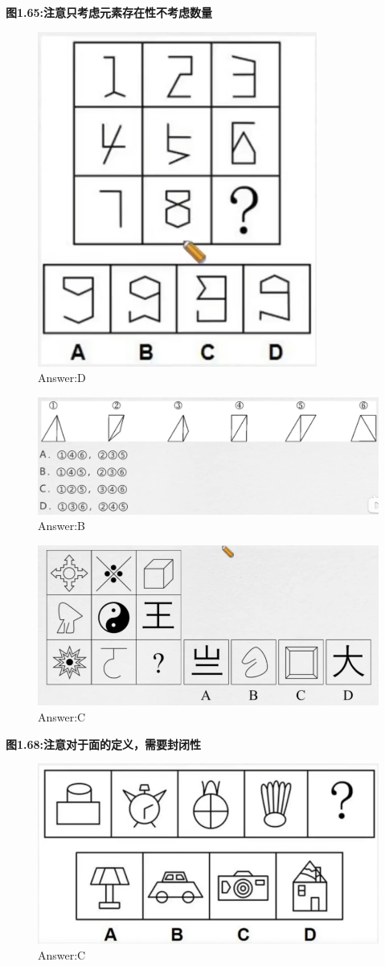 \documentclass{article}
\numberwithin{equation}{section}						%
\numberwithin{figure}{section}							%
\begin{document}
\begin{sloppypar}
\textbf{图1.65:注意只考虑元素存在性不考虑数量}

\begin{figure}[H]
     \centering
     \includegraphics[width=0.4\linewidth]{69.png}
		\caption{Answer:D}
\end{figure}


\begin{figure}[H]
     \centering
     \includegraphics[width=0.6\linewidth]{70.png}
		\caption{Answer:B}
\end{figure}

\begin{figure}[H]
     \centering
     \includegraphics[width=0.6\linewidth]{71.png}
		\caption{Answer:C}
\end{figure}

\textbf{图1.68:注意对于面的定义，需要封闭性}

\begin{figure}[H]
     \centering
     \includegraphics[width=0.6\linewidth]{72.png}
		\caption{Answer:C}
\end{figure}



\end{sloppypar}
\end{document}

